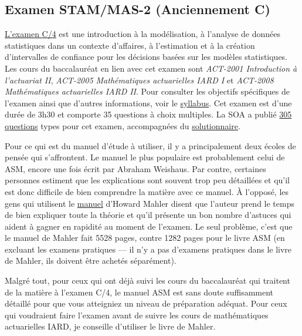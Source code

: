 \newpage
\subsection*{Examen STAM/MAS-2 (Anciennement C)}
\label{subsec:examc}
\href{https://www.soa.org/education/exam-req/edu-exam-c-detail.aspx}{L'examen C/4} est une introduction à la modélisation, à l'analyse de données statistiques dans un contexte d'affaires, à l'estimation et à la création d'intervalles de confiance pour les décisions basées sur les modèles statistiques. Les cours du baccalauréat en lien avec cet examen sont \textit{ACT-2001 Introduction à l'actuariat II}, \textit{ACT-2005 Mathématiques actuarielles IARD I} et \textit{ACT-2008 Mathématiques actuarielles IARD II}. Pour consulter les objectifs spécifiques de l'examen ainsi que d'autres informations, voir le \href{https://www.soa.org/Files/Edu/2017/edu-2017-02-exam-c-syllabus.pdf}{syllabus}. Cet examen est d'une durée de 3h30 et comporte 35 questions à choix multiples. La SOA a publié \href{http://www.soa.org/files/edu/edu-exam-c-sample-quest.pdf}{305 questions} types pour cet examen, accompagnées du \href{http://www.soa.org/files/edu/edu-exam-c-sample-sol.pdf}{solutionnaire}.\vspace{\baselineskip}

Pour ce qui est du manuel d'étude à utiliser, il y a principalement deux écoles de pensée qui s'affrontent. Le manuel le plus populaire est probablement celui de ASM, encore une fois écrit par Abraham Weishaus. Par contre, certaines personnes estiment que les explications sont souvent trop peu détaillées et qu'il est donc difficile de bien comprendre la matière avec ce manuel. À l'opposé, les gens qui utilisent le \href{http://howardmahler.com/Teaching/C.html}{manuel} d'Howard Mahler disent que l'auteur prend le temps de bien expliquer toute la théorie et qu'il présente un bon nombre d'astuces qui aident à gagner en rapidité au moment de l'examen. Le seul problème, c'est que le manuel de Mahler fait 5528 pages, contre 1282 pages pour le livre ASM (en excluant les examens pratiques --- il n'y a pas d'examens pratiques dans le livre de Mahler, ils doivent être achetés séparément). \vspace{\baselineskip}

Malgré tout, pour ceux qui ont déjà suivi les cours du baccalauréat qui traitent de la matière à l'examen C/4, le manuel ASM est sans doute suffisamment détaillé pour que vous atteigniez un niveau de préparation adéquat. Pour ceux qui voudraient faire l'examen avant de suivre les cours de mathématiques actuarielles IARD, je conseille d'utiliser le livre de Mahler.\vspace{\baselineskip}

